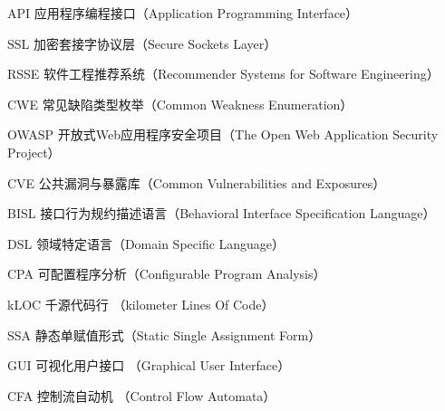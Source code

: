 \begin{denotation}[3cm]
\item[API] 应用程序编程接口（Application Programming Interface）
\item[SSL] 加密套接字协议层（Secure Sockets Layer）
\item[RSSE] 软件工程推荐系统（Recommender Systems for Software Engineering）
\item[CWE] 常见缺陷类型枚举（Common Weakness Enumeration）
\item[OWASP] 开放式Web应用程序安全项目（The Open Web Application Security Project）
\item[CVE] 公共漏洞与暴露库（Common Vulnerabilities and Exposures）
\item[BISL] 接口行为规约描述语言（Behavioral Interface Specification Language）
\item[DSL] 领域特定语言（Domain Specific Language）
\item[CPA] 可配置程序分析（Configurable Program Analysis）
\item[kLOC] 千源代码行 （kilometer Lines Of Code）
\item[SSA] 静态单赋值形式（Static Single Assignment Form）
\item[GUI] 可视化用户接口 （Graphical User Interface）
\item[CFA] 控制流自动机 （Control Flow Automata）
\end{denotation}
